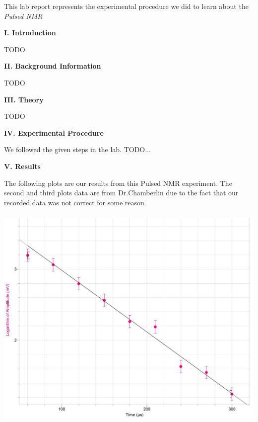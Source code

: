 \documentclass[fleqn]{article}
\begin{document}
  \vspace{10px}

  This lab report represents the experimental procedure we did to learn about the \emph{Pulsed NMR} \textcite{One}

  \vspace{20px}


  \textbf{I. Introduction}

  \vspace{10px}

  TODO 

  \vspace{20px}


  \textbf{II. Background Information}

  \vspace{10px}

  TODO 

  \vspace{20px}


  \textbf{III. Theory}

  \vspace{10px}

  TODO 

  \vspace{20px}


  \textbf{IV. Experimental Procedure}

  \vspace{10px}

  We followed the given steps in the lab. TODO...
  
  \vspace{20px}

  \textbf{V. Results}

  \vspace{10px}

  The following plots are our results from this Pulsed NMR experiment. The second and third plots data are from Dr.Chamberlin due to the fact that our recorded data 
  was not correct for some reason.

  \pagebreak

  \includegraphics[height=11cm, width=16cm]{Fig1.JPG}
  
\end{document}
